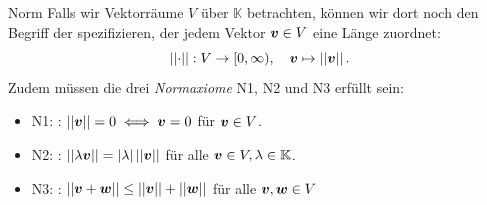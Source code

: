 \begin{Def}
{Norm}
Falls wir Vektorräume $V$ über $\mathbb{K}$ betrachten, können wir dort noch den Begriff der  spezifizieren, der jedem Vektor $\vvec\in V$ eine Länge zuordnet:
\begin{equation}
    \Norm{\cdot}:V\to[0,\infty),\quad \vvec\mapsto\Norm{\vvec}.
\end{equation}
Zudem müssen die drei \textit{Normaxiome} N1, N2 und N3 erfüllt sein:
\begin{itemize}
    \item N1: : $\Norm{\vvec}=0\iff \vvec=0$ für $\vvec\in V$.
    \item N2: : $\Norm{\lambda \vvec}=\Abs{\lambda}\Norm{\vvec}$ für alle $\vvec\in V,\lambda \in\mathbb{K}$.
    \item N3: : $\Norm{\vvec+\wvec}\leq\Norm{\vvec}+\Norm{\wvec}$ für alle $\vvec,\wvec\in V$ 
\end{itemize}
\end{Def}
